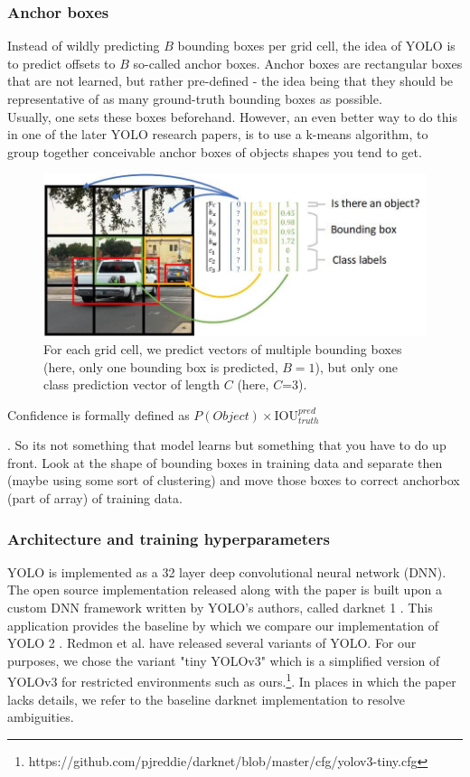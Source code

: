 \documentclass[a4paper]{article}
\begin{document}
\subsubsection*{Anchor boxes}
Instead of wildly predicting $B$ bounding boxes per grid cell, the idea of YOLO is to predict offsets to $B$ so-called anchor boxes. Anchor boxes are rectangular boxes that are not learned, but rather pre-defined - the idea being that they should be representative of as many ground-truth bounding boxes as possible. \\
Usually, one sets these boxes beforehand. However, an even better way to do this in one of the later YOLO research papers, is to use a k-means algorithm, to group together conceivable anchor boxes of objects shapes you tend to get. 
\begin{figure}
\includegraphics[scale=0.35]{yolo_mechanics}
\caption{For each grid cell, we predict vectors of multiple bounding boxes (here, only one bounding box is predicted, $B=1$), but only one class prediction vector of length $C$ (here, $C$=3).}

\end{figure}
Confidence is formally defined as $P(Object) \times \text{IOU}^{pred}_{truth}$

. So its not something that model learns but something that you have to do up front. Look at the shape of bounding boxes in training data and separate then (maybe using some sort of clustering) and move those boxes to correct anchorbox (part of array) of training data.

\subsubsection*{Architecture and training hyperparameters}
YOLO is implemented as a 32 layer deep convolutional
neural network (DNN). The open source implementation released
along with the paper is built upon a custom DNN
framework written by YOLO’s authors, called darknet 1
.
This application provides the baseline by which we compare
our implementation of YOLO 2
. Redmon et al. have
released several variants of YOLO. For our purposes, we
chose the variant "tiny YOLOv3" which is a simplified version of YOLOv3 for restricted environments such as ours.\footnote{https://github.com/pjreddie/darknet/blob/master/cfg/yolov3-tiny.cfg}. In places in which the paper lacks details, we refer to the baseline darknet implementation
to resolve ambiguities.
\end{document}
